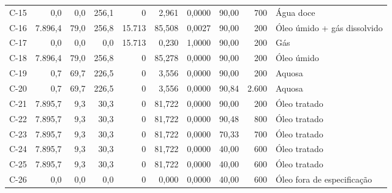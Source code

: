 \documentclass[11pt,a4paper]{article}
\numberwithin{equation}{section}
\numberwithin{table}{section}
\numberwithin{figure}{section}
\begin{document}
{\begin{longtable}{lrrrrrrrrL{2.5cm}}
C-15 & 0,0 & 0,0 & 256,1 & 0 & 2,961 & 0,0000 & 90,00 & 700 & {\scriptsize Água doce}\\
C-16 & 7.896,4 & 79,0 & 256,8 & 15.713 & 85,508 & 0,0027 & 90,00 & 200 & {\scriptsize Óleo úmido + gás dissolvido}\\
C-17 & 0,0 & 0,0 & 0,0 & 15.713 & 0,230 & 1,0000 & 90,00 & 200 & {\scriptsize Gás}\\
C-18 & 7.896,4 & 79,0 & 256,8 & 0 & 85,278 & 0,0000 & 90,00 & 200 & {\scriptsize Óleo úmido}\\
C-19 & 0,7 & 69,7 & 226,5 & 0 & 3,556 & 0,0000 & 90,00 & 200 & {\scriptsize Aquosa}\\
C-20 & 0,7 & 69,7 & 226,5 & 0 & 3,556 & 0,0000 & 90,84 & 2.600 & {\scriptsize Aquosa}\\
C-21 & 7.895,7 & 9,3 & 30,3 & 0 & 81,722 & 0,0000 & 90,00 & 200 & {\scriptsize Óleo tratado}\\
C-22 & 7.895,7 & 9,3 & 30,3 & 0 & 81,722 & 0,0000 & 90,48 & 800 & {\scriptsize Óleo tratado}\\
C-23 & 7.895,7 & 9,3 & 30,3 & 0 & 81,722 & 0,0000 & 70,33 & 700 & {\scriptsize Óleo tratado}\\
C-24 & 7.895,7 & 9,3 & 30,3 & 0 & 81,722 & 0,0000 & 40,00 & 600 & {\scriptsize Óleo tratado}\\
C-25 & 7.895,7 & 9,3 & 30,3 & 0 & 81,722 & 0,0000 & 40,00 & 600 & {\scriptsize Óleo tratado}\\
C-26 & 0,0 & 0,0 & 0,0 & 0 & 0,000 & 0,0000 & 40,00 & 600 & {\scriptsize Óleo fora de especificação}\\
\bottomrule\end{longtable}}
\end{document}
